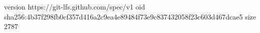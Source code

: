 version https://git-lfs.github.com/spec/v1
oid sha256:4b37f298fb0cf357d416a2c9ea4e89484f73e9c837432058f23c603d467dcae5
size 2787
